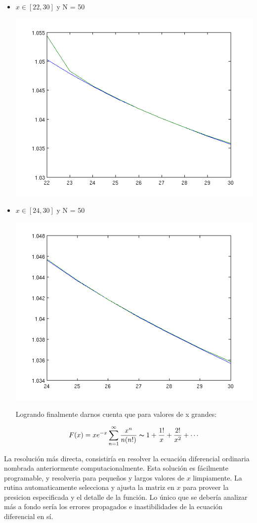 \begin{itemize}
\item $x \in [22,30]$ y N = 50


\begin{center}
\includegraphics[scale=0.5]{images/2c.png}
\end{center}

\item $x \in [24,30]$ y N = 50

\begin{center}
\includegraphics[scale=0.5]{images/2d.png}
\end{center}


Logrando finalmente darnos cuenta que para valores de x grandes:

$$
F(x) = x e^{-x} \sum_{n=1}^{\infty}\frac{x^n}{n(n!)} \thicksim 1 + \frac{1!}{x} + \frac{2!}{x^2} + \cdots
$$


\end{itemize}

La resolución más directa, consistiría en resolver la ecuación diferencial
ordinaria nombrada anteriormente computacionalmente. Esta solución es
fácilmente programable, y resolveria para pequeños y largos valores de $x$
limpiamente. La rutina automaticamente selecciona y ajusta la matriz en $x$
para proveer la presicion especificada y el detalle de la función. Lo único
que se debería analizar más a fondo sería los errores propagados e
inastibilidades de la ecuación diferencial en sí.
